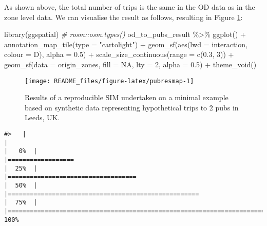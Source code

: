 \documentclass[11pt,letterpaper]{article}
\newenvironment{Shaded}{\begin{snugshade}}{\end{snugshade}}
\newcommand{\AttributeTok}[1]{\textcolor[rgb]{0.77,0.63,0.00}{#1}}
\newcommand{\CommentTok}[1]{\textcolor[rgb]{0.56,0.35,0.01}{\textit{#1}}}
\newcommand{\ConstantTok}[1]{\textcolor[rgb]{0.00,0.00,0.00}{#1}}
\newcommand{\DecValTok}[1]{\textcolor[rgb]{0.00,0.00,0.81}{#1}}
\newcommand{\FloatTok}[1]{\textcolor[rgb]{0.00,0.00,0.81}{#1}}
\newcommand{\FunctionTok}[1]{\textcolor[rgb]{0.00,0.00,0.00}{#1}}
\newcommand{\NormalTok}[1]{#1}
\newcommand{\SpecialCharTok}[1]{\textcolor[rgb]{0.00,0.00,0.00}{#1}}
\newcommand{\StringTok}[1]{\textcolor[rgb]{0.31,0.60,0.02}{#1}}
\begin{document}
As shown above, the total number of trips is the same in the OD data as in the zone level data.
We can visualise the result as follows, resulting in Figure \ref{fig:pubresmap}:

\begin{Shaded}
\begin{Highlighting}[]
\FunctionTok{library}\NormalTok{(ggspatial)}
\CommentTok{\# rosm::osm.types()}
\NormalTok{od\_to\_pubs\_result }\SpecialCharTok{\%\textgreater{}\%} 
  \FunctionTok{ggplot}\NormalTok{() }\SpecialCharTok{+}
  \FunctionTok{annotation\_map\_tile}\NormalTok{(}\AttributeTok{type =} \StringTok{"cartolight"}\NormalTok{) }\SpecialCharTok{+}
  \FunctionTok{geom\_sf}\NormalTok{(}\FunctionTok{aes}\NormalTok{(}\AttributeTok{lwd =}\NormalTok{ interaction, }\AttributeTok{colour =}\NormalTok{ D), }\AttributeTok{alpha =} \FloatTok{0.5}\NormalTok{) }\SpecialCharTok{+}
  \FunctionTok{scale\_size\_continuous}\NormalTok{(}\AttributeTok{range =} \FunctionTok{c}\NormalTok{(}\FloatTok{0.3}\NormalTok{, }\DecValTok{3}\NormalTok{)) }\SpecialCharTok{+}
  \FunctionTok{geom\_sf}\NormalTok{(}\AttributeTok{data =}\NormalTok{ origin\_zones, }\AttributeTok{fill =} \ConstantTok{NA}\NormalTok{, }\AttributeTok{lty =} \DecValTok{2}\NormalTok{, }\AttributeTok{alpha =} \FloatTok{0.5}\NormalTok{) }\SpecialCharTok{+}
  \FunctionTok{theme\_void}\NormalTok{()}
\end{Highlighting}
\end{Shaded}

\begin{figure}
\texttt{[image: README\_files/figure-latex/pubresmap-1]} \caption{Results of a reproducible SIM undertaken on a minimal example based on synthetic data representing hypothetical trips to 2 pubs in Leeds, UK.}\label{fig:pubresmap}
\end{figure}

\begin{verbatim}
#>   |                                                                              |                                                                      |   0%  |                                                                              |==================                                                    |  25%  |                                                                              |===================================                                   |  50%  |                                                                              |====================================================                  |  75%  |                                                                              |======================================================================| 100%
\end{verbatim}
\end{document}
